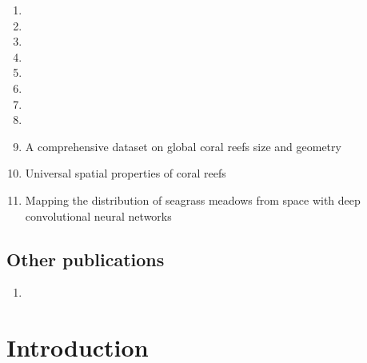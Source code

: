 \documentclass[
	10pt, %
	fleqn, %
	a4paper, %
]{LegrandOrangeBook}
\begin{document}
\begin{enumerate}
	\item {}
	      \vspace{0.5 cm}
	\item {}
	      \vspace{0.5 cm}
	\item {}
	      \vspace{0.5 cm}
	\item {}
	      \vspace{0.5 cm}
	\item {}
	      \vspace{0.5 cm}
	\item {}
	      \vspace{0.5 cm}
	\item {}
	      \vspace{0.5 cm}
	\item {}
	      \vspace{0.5 cm}
	\item A comprehensive dataset on global coral reefs size and geometry
	\item Universal spatial properties of coral reefs
	\item Mapping the distribution of seagrass meadows from space with deep
	      convolutional neural networks
\end{enumerate}

\chapter*{Other publications}

\begin{enumerate}
	\item {}
	      \vspace{0.5 cm}
\end{enumerate}


\part{Introduction}
\end{document}
